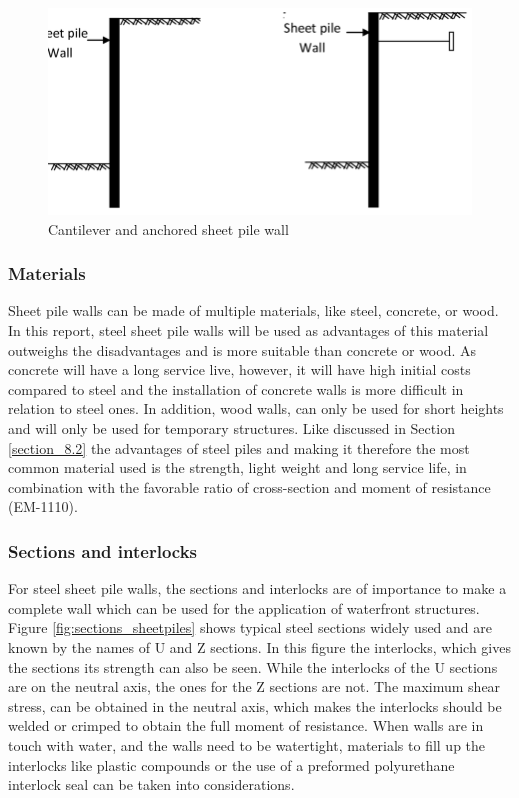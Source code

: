 \begin{figure}[H]
    \centering
    \includegraphics[width=0.50\linewidth]{figures/ch8/Anchored-Sheet-pile-wall.png}
    \caption{Cantilever and anchored sheet pile wall}
    \label{fig:sheetpiles}
\end{figure}


\subsubsection{Materials}

Sheet pile walls can be made of multiple materials, like steel, concrete, or wood. In this report, steel sheet pile walls will be used as advantages of this material outweighs the disadvantages and is more suitable than concrete or wood. As concrete will have a long service live, however, it will have high initial costs compared to steel and the installation of concrete walls is more difficult in relation to steel ones. In addition, wood walls, can only be used for short heights and will only be used for temporary structures. Like discussed in Section \ref{section_8.2} the advantages of steel piles and making it therefore the most common material used is the strength, light weight and long service life, in combination with the favorable ratio of cross-section and moment of resistance (EM-1110).

\subsubsection{Sections and interlocks}

For steel sheet pile walls, the sections and interlocks are of importance to make a complete wall which can be used for the application of waterfront structures. Figure \ref{fig:sections_sheetpiles} shows typical steel sections widely used and are known by the names of U and Z sections. In this figure the interlocks, which gives the sections its strength can also be seen. While the interlocks of the U sections are on the neutral axis, the ones for the Z sections are not. The maximum shear stress, can be obtained in the neutral axis, which makes the interlocks should be welded or crimped to obtain the full moment of resistance. When walls are in touch with water, and the walls need to be watertight, materials to fill up the interlocks like plastic compounds or the use of a preformed polyurethane interlock seal can be taken into considerations. 

